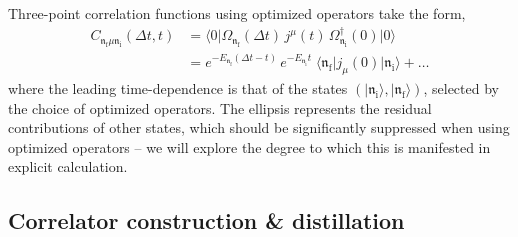\documentclass[twocolumn,amsmath,amssymb,prd,10pt,floatfix, 
superscriptaddress,nofootinbib, showpacs, preprintnumbers]{revtex4-1}
\begin{document}
Three-point correlation functions using optimized operators take the form,
\begin{align}
	C_{\mathfrak{n}_\mathrm{f} \mu \mathfrak{n}_\mathrm{i}}(\Delta t, t) 
		&= \big\langle 0 \big| \Omega^{\,}_{\mathfrak{n}_\mathrm{f}}(\Delta t) \, j^\mu(t) \, \Omega^\dag_{\mathfrak{n}_\mathrm{i}}(0) \big| 0 \big\rangle \nonumber \\
		&= e^{-E_{\mathfrak{n}_\mathrm{f}}(\Delta t - t)} \,  e^{-E_{\mathfrak{n}_\mathrm{i}}t}  \; 
	 	\big\langle \mathfrak{n}_\mathrm{f} \big| j_\mu(0) \big| \mathfrak{n}_\mathrm{i} \big\rangle + \ldots
\end{align}
where the leading time-dependence is that of the states $(| \mathfrak{n}_\mathrm{i} \rangle, | \mathfrak{n}_\mathrm{f} \rangle)$, selected by the choice of optimized operators. The ellipsis represents the residual contributions of other states, which should be significantly suppressed when using optimized operators -- we will explore the degree to which this is manifested in explicit calculation.


\subsection{Correlator construction \& distillation \label{ssec::three_points_corr_const} }
\end{document}

